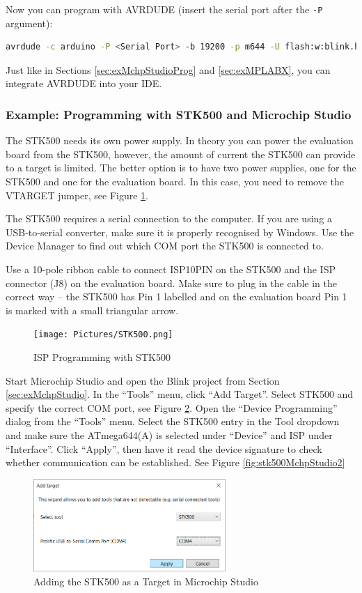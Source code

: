 \documentclass{article}
\begin{document}
Now you can program with AVRDUDE (insert the serial port after the \texttt{-P} argument):
\begin{lstlisting}[language=bash]
avrdude -c arduino -P <Serial Port> -b 19200 -p m644 -U flash:w:blink.hex:i
\end{lstlisting}

Just like in Sections \ref{sec:exMchpStudioProg} and \ref{sec:exMPLABX}, you can integrate AVRDUDE into your IDE. 
\FloatBarrier

\subsubsection{Example: Programming with STK500 and Microchip Studio}
The STK500 needs its own power supply. In theory you can power the evaluation board from the STK500, however, the amount of current the STK500 can provide to a target is limited. The better option is to have two power supplies, one for the STK500 and one for the evaluation board. In this case, you need to remove the VTARGET jumper, see Figure \ref{fig:stk500}. 

The STK500 requires a serial connection to the computer. If you are using a USB-to-serial converter, make sure it is properly recognised by Windows. Use the Device Manager to find out which COM port the STK500 is connected to. 

Use a 10-pole ribbon cable to connect ISP10PIN on the STK500 and the ISP connector (J8) on the evaluation board. Make sure to plug in the cable in the correct way -- the STK500 has Pin 1 labelled and on the evaluation board Pin 1 is marked with a small triangular arrow. 

\begin{figure}[htb]
\centering
\texttt{[image: Pictures/STK500.png]}
\caption{ISP Programming with STK500}
\label{fig:stk500}
\end{figure}

Start Microchip Studio and open the Blink project from Section \ref{sec:exMchpStudio}. In the ``Tools'' menu, click ``Add Target''. Select STK500 and specify the correct COM port, see Figure \ref{fig:stk500MchpStudio1}. Open the ``Device Programming'' dialog from the ``Tools'' menu. Select the STK500 entry in the Tool dropdown and make sure the ATmega644(A) is selected under ``Device'' and ISP under ``Interface''. Click ``Apply'', then have it read the device signature to check whether communication can be established. See Figure \ref{fig:stk500MchpStudio2}

\begin{figure}[htb]
\centering
\includegraphics[width=0.65\textwidth]{Pictures/STK500MchpStudio1.png}
\caption{Adding the STK500 as a Target in Microchip Studio}
\label{fig:stk500MchpStudio1}
\end{figure}
\end{document}
